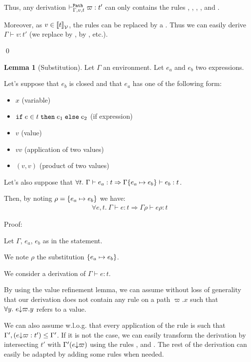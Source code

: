 \documentclass[a4paper]{article}
\theoremstyle{definition}
\newtheorem{lemma}{Lemma}
\begin{document}
        Thus, any derivation $\vdash^{\texttt{Path}}_{\Gamma,v,t} \varpi:t'$ can only contains the rules
        , , , ,  and .

        Moreover, as $v \in {\llbracket t \rrbracket}_{\mathcal{V}}$, the rules  can be replaced by a .
        Thus we can easily derive $\Gamma \vdash v:t'$ (we replace  by ,
         by , etc.).

        \qed

        \begin{lemma}[Substitution]
          Let $\Gamma$ an environment. Let $e_a$ and $e_b$ two expressions.

          Let's suppose that $e_b$ is closed and that $e_a$ has one of the following form:
          \begin{itemize}
            \item $x$ (variable)
            \item $\texttt{if}\;e\in t\;\texttt{then}\;e_1\;\texttt{else}\;e_2$ (if expression)
            \item $v$ (value)
            \item $v v$ (application of two values)
            \item $(v,v)$ (product of two values)
          \end{itemize}
          Let's also suppose that $\forall t.\ \Gamma \vdash e_a : t \Rightarrow \Gamma\{e_a \mapsto e_b\} \vdash e_b:t$.
          
          Then, by noting $\rho = \{e_a \mapsto e_b\}$ we have:
          \begin{align*}
            &\forall e,t.\ \Gamma \vdash e:t \Rightarrow \Gamma\rho \vdash e\rho:t
          \end{align*}
        \end{lemma}

        Proof:

        Let $\Gamma$, $e_a$, $e_b$ as in the statement.

        We note $\rho$ the substitution $\{e_a \mapsto e_b\}$.

        We consider a derivation of $\Gamma \vdash e:t$.

        By using the value refinement lemma, we can assume without loss of generality that our derivation does not contain
        any rule  on a path $\varpi.x$ such that $\forall y.\ e{\downarrow}\varpi.y$ refers to a value.

        We can also assume w.l.o.g. that every application of the  rule is such that $\Gamma',(e{\downarrow}\varpi:t') \leq \Gamma'$. If it is not the case,
        we can easily transform the derivation by intersecting $t'$ with $\Gamma'(e{\downarrow}\varpi)$
        using the rules ,  and .
        The rest of the derivation can easily be adapted by adding some  rules when needed.
\end{document}
